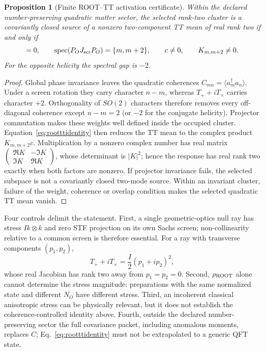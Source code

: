 \documentclass[11pt]{article}
\newtheorem{proposition}{Proposition}
\begin{document}
\begin{proposition}[Finite ROOT--TT activation certificate]
\label{prop:rootttcertificate}
Within the declared number-preserving quadratic matter sector, the selected
rank-two cluster is a covariantly closed source of a nonzero two-component TT
mean of real rank two if and only if
\begin{equation}
 [P_O,J_{\rm scr}]=0,\qquad
 \operatorname{spec}(P_OJ_{\rm scr}P_O)=\{m,m+2\},\qquad
 c\neq0,\qquad K_{m,m+2}\neq0.
\label{eq:rootttcertificate}
\end{equation}
For the opposite helicity the spectral gap is $-2$.
\end{proposition}

\begin{proof}
Global phase invariance leaves the quadratic coherences
$C_{mn}=\langle a_m^\dagger a_n\rangle$.  Under a screen rotation they carry
character $n-m$, whereas $T_++iT_\times$ carries character $+2$.
Orthogonality of $SO(2)$ characters therefore removes every off-diagonal
coherence except $n-m=2$ (or $-2$ for the conjugate helicity).  Projector
commutation makes these weights well defined inside the occupied cluster.
Equation~\eqref{eq:rootttidentity} then reduces the TT mean to the complex
product $K_{m,m+2}c$.  Multiplication by a nonzero complex number has real
matrix
$\left(\begin{smallmatrix}\Re K&-\Im K\\\Im K&\Re K\end{smallmatrix}\right)$,
whose determinant is $|K|^2$; hence the response has real rank two exactly
when both factors are nonzero.  If projector invariance fails, the selected
subspace is not a covariantly closed two-mode source.  Within an invariant
cluster, failure of the weight, coherence or overlap condition makes the
selected quadratic TT mean vanish.
\end{proof}

Four controls delimit the statement.  First, a single geometric-optics null
ray has stress $I k\otimes k$ and zero STF projection on its own Sachs screen;
non-collinearity relative to a common screen is therefore essential.  For a
ray with transverse components $(p_1,p_2)$,
\begin{equation}
T_+ + iT_\times=\frac{I}{2}(p_1+ip_2)^2,
\end{equation}
whose real Jacobian has rank two away from $p_1=p_2=0$.  Second,
$\rho_{\rm ROOT}$ alone cannot determine the stress magnitude: preparations
with the same normalized state and different $N_O$ have different stress.
Third, an incoherent classical anisotropic stress can be physically relevant,
but it does not establish the coherence-controlled identity above.
Fourth, outside the declared number-preserving sector the full covariance
packet, including anomalous moments, replaces $C$;
Eq.~\eqref{eq:rootttidentity} must not be extrapolated to a generic QFT state.
\end{document}

